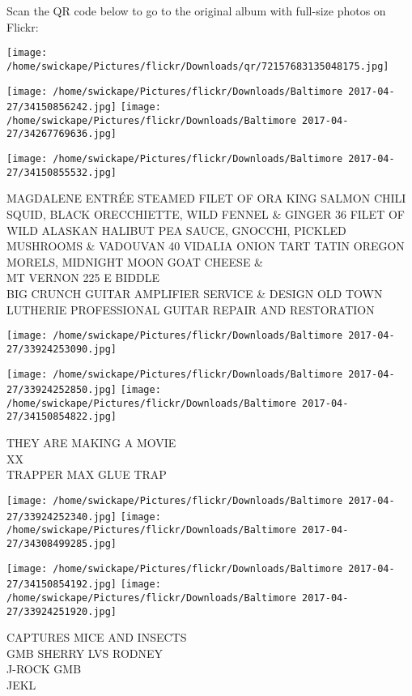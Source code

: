 \documentclass[10pt,letterpaper]{article}
\begin{document}
Scan the QR code below to go to the original album with full-size photos on Flickr:

\texttt{[image: /home/swickape/Pictures/flickr/Downloads/qr/72157683135048175.jpg]}
\pagebreak

\texttt{[image: /home/swickape/Pictures/flickr/Downloads/Baltimore 2017-04-27/34150856242.jpg]}
\texttt{[image: /home/swickape/Pictures/flickr/Downloads/Baltimore 2017-04-27/34267769636.jpg]}

\texttt{[image: /home/swickape/Pictures/flickr/Downloads/Baltimore 2017-04-27/34150855532.jpg]}

MAGDALENE ENTRÉE STEAMED FILET OF ORA KING SALMON CHILI SQUID, BLACK ORECCHIETTE, WILD FENNEL \& GINGER 36 FILET OF WILD ALASKAN HALIBUT PEA SAUCE, GNOCCHI, PICKLED MUSHROOMS \& VADOUVAN 40 VIDALIA ONION TART TATIN OREGON MORELS, MIDNIGHT MOON GOAT CHEESE \&\\
MT VERNON 225 E BIDDLE\\
BIG CRUNCH GUITAR AMPLIFIER SERVICE \& DESIGN OLD TOWN LUTHERIE PROFESSIONAL GUITAR REPAIR AND RESTORATION
\pagebreak

\texttt{[image: /home/swickape/Pictures/flickr/Downloads/Baltimore 2017-04-27/33924253090.jpg]}

\vspace{0.25in}
\texttt{[image: /home/swickape/Pictures/flickr/Downloads/Baltimore 2017-04-27/33924252850.jpg]}
\texttt{[image: /home/swickape/Pictures/flickr/Downloads/Baltimore 2017-04-27/34150854822.jpg]}

THEY ARE MAKING A MOVIE\\
XX\\
TRAPPER MAX GLUE TRAP
\pagebreak

\texttt{[image: /home/swickape/Pictures/flickr/Downloads/Baltimore 2017-04-27/33924252340.jpg]}
\texttt{[image: /home/swickape/Pictures/flickr/Downloads/Baltimore 2017-04-27/34308499285.jpg]}

\texttt{[image: /home/swickape/Pictures/flickr/Downloads/Baltimore 2017-04-27/34150854192.jpg]}
\texttt{[image: /home/swickape/Pictures/flickr/Downloads/Baltimore 2017-04-27/33924251920.jpg]}

CAPTURES MICE AND INSECTS\\
GMB SHERRY LVS RODNEY\\
J{-}ROCK GMB\\
JEKL
\pagebreak
\end{document}

